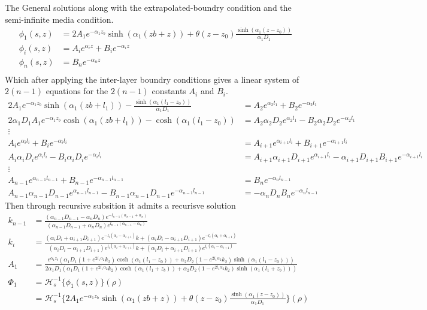 \documentclass{article}
\begin{document}
The General solutions along with the extrapolated-boundry condition and the semi-infinite media condition.
\begin{align*}
\phi_1(s, z) &= 2 A_1 e^{-\alpha_1 z_b} \sinh(\alpha_1(zb + z)) + \theta(z-z_0)\frac{\sinh(\alpha_1(z-z_0))}{\alpha_1 D_1}\\
\phi_i(s, z) &= A_i e^{\alpha_i z} + B_i e^{-\alpha_i z} \\
\phi_n(s, z) &= B_n e^{-\alpha_n z} \\
\end{align*}
Which after applying the inter-layer boundry conditions gives a linear system of $2(n-1)$ equations for the 
$2(n-1)$ constants $A_i$ and $B_i$.
\begin{align*}
2 A_1 e^{-\alpha_1 z_b} \sinh(\alpha_1(zb + l_1)) - \frac{\sinh(\alpha_1(l_1-z_0))}{\alpha_1 D_1} &=
A_2 e^{\alpha_2 l_1} + B_2 e^{-\alpha_2 l_1} \\
2 \alpha_1 D_1 A_1 e^{-\alpha_1 z_b} \cosh(\alpha_1(zb + l_1)) - \cosh(\alpha_1(l_1-z_0)) &=
A_2 \alpha_2 D_2 e^{\alpha_2 l_1} - B_2 \alpha_2 D_2 e^{-\alpha_2 l_1} \\
\vdots \\
A_i e^{\alpha_i l_i} + B_i e^{-\alpha_i l_i} &= A_{i+1} e^{\alpha_{i+1} l_i} + B_{i+1} e^{-\alpha_{i+1} l_i} \\
A_i \alpha_i D_i e^{\alpha_i l_i} - B_i \alpha_i D_i e^{-\alpha_i l_i} &= A_{i+1} \alpha_{i+1} D_{i+1} e^{\alpha_{i+1} l_i} - \alpha_{i+1} D_{i+1} B_{i+1} e^{-\alpha_{i+1} l_i} \\
\vdots \\
A_{n-1} e^{\alpha_{n-1} l_{n-1}} + B_{n-1} e^{-\alpha_{n-1} l_{n-1}} &= B_n e^{-\alpha_n l_{n-1}} \\
A_{n-1} \alpha_{n-1} D_{n-1} e^{\alpha_{n-1} l_{n-1}} - B_{n-1} \alpha_{n-1} D_{n-1} e^{-\alpha_{n-1} l_{n-1}} &= - \alpha_n D_n B_n e^{-\alpha_n l_{n-1}}
\end{align*}
Then through recursive subsition it admits a recurisve solution
\begin{align*}
k_{n-1} &= \frac{(\alpha_{n-1}D_{n-1}-\alpha_n D_n)e^{-l_{n-1}(\alpha_{n-1} + \alpha_n)}}{(\alpha_{n-1}D_{n-1}+\alpha_n D_n)e^{l_{n-1}(\alpha_{n-1} - \alpha_n)}} \\
k_i &= \frac{
(\alpha_i D_i + \alpha_{i+1} D_{i+1})e^{-l_i(\alpha_i - \alpha_{i+1})} k +
(\alpha_i D_i - \alpha_{i+1} D_{i+1})e^{-l_i(\alpha_i + \alpha_{i+1})}
}{
(\alpha_i D_i - \alpha_{i+1} D_{i+1})e^{l_i(\alpha_i + \alpha_{i+1})} k +
(\alpha_i D_i + \alpha_{i+1} D_{i+1})e^{l_i(\alpha_i - \alpha_{i+1})}} \\
A_1 &= \frac{
e^{\alpha_1 z_b} (\alpha_1 D_1 (1 + e^{2 l_1 \alpha_2} k_2) \cosh(\alpha_1 (l_1 - z_0)) +
    \alpha_2 D_2 (1 - e^{2 l_1 \alpha_2} k_2) \sinh(\alpha_1 (l_1 - z_0)))
}{
2 \alpha_1 D_1 (\alpha_1 D_1 (1 + e^{2 l_1 \alpha_2} k_2) \cosh(\alpha_1 (l_1 + z_b)) +
    \alpha_2 D_2 (1 - e^{2 l_1 \alpha_2} k_2) \sinh(\alpha_1 (l_1 + z_b)))
} \\
\Phi_1 &= \mathcal{H}^{-1}_s\{{\phi_1(s, z)}\}(\rho) \\
&= \mathcal{H}^{-1}_s\{{2 A_1 e^{-\alpha_1 z_b} \sinh(\alpha_1(zb + z)) + \theta(z-z_0)\frac{\sinh(\alpha_1(z-z_0))}{\alpha_1 D_1}}\}(\rho)
\end{align*}
\end{document}
